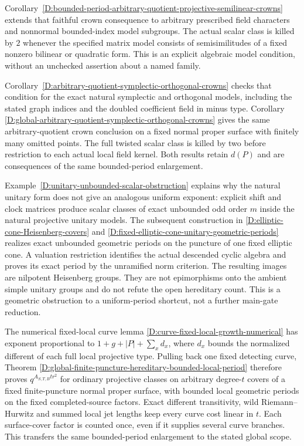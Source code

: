 Corollary~\ref{D:bounded-period-arbitrary-quotient-projective-semilinear-crowns}
extends that faithful crown consequence to arbitrary prescribed
field characters and nonnormal bounded-index model subgroups.
The actual scalar class is killed by $2$ whenever the specified
matrix model consists of semisimilitudes of a fixed nonzero
bilinear or quadratic form. This is an explicit algebraic model
condition, without an unchecked assertion about a named family.

Corollary~\ref{D:arbitrary-quotient-symplectic-orthogonal-crowns}
checks that condition for the exact natural symplectic and orthogonal
models, including the stated graph indices and the doubled coefficient
field in minus type. Corollary
\ref{D:global-arbitrary-quotient-symplectic-orthogonal-crowns}
gives the same arbitrary-quotient crown conclusion on a fixed normal
proper surface with finitely many omitted points. The full twisted
scalar class is killed by two before restriction to each actual local
field kernel. Both results retain $d(P)$ and are consequences of the
same bounded-period enlargement.

Example~\ref{D:unitary-unbounded-scalar-obstruction} explains why the
natural unitary form does not give an analogous uniform exponent:
explicit shift and clock matrices produce scalar classes of exact
unbounded odd order $m$ inside the natural projective unitary models.
The subsequent construction in
\ref{D:elliptic-cone-Heisenberg-covers} and
\ref{D:fixed-elliptic-cone-unitary-geometric-periods} realizes exact
unbounded geometric periods on the puncture of one fixed elliptic
cone. A valuation restriction identifies the actual descended cyclic
algebra and proves its exact period by the unramified norm criterion.
The resulting images are nilpotent Heisenberg groups. They are not
epimorphisms onto the ambient simple unitary groups and do not refute
the open hereditary count. This is a geometric obstruction to a
uniform-period shortcut, not a further main-gate reduction.

The numerical fixed-local curve lemma
\ref{D:curve-fixed-local-growth-numerical} has exponent proportional
to $1+g+|P|+\sum_x d_x$, where $d_x$ bounds the normalized
different of each full local projective type. Pulling back one
fixed detecting curve, Theorem
\ref{D:global-finite-puncture-hereditary-bounded-local-period}
therefore proves $q^{A_{S,T,B}tr^2}$ for ordinary projective classes
on arbitrary degree-$t$ covers of a fixed finite-puncture normal
proper surface, with bounded local geometric periods on the
fixed completed-source factors. Exact different transitivity,
wild Riemann--Hurwitz and summed local jet lengths keep every
curve cost linear in $t$. Each surface-cover factor is counted
once, even if it supplies several curve branches. This transfers
the same bounded-period enlargement to the stated global scope.

